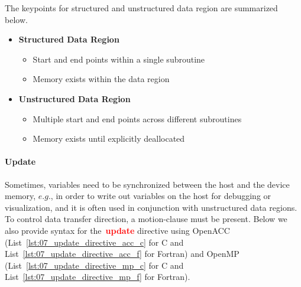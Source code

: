 











\par
The keypoints for structured and unstructured data region are summarized below.
\begin{itemize}
    \item \textbf{Structured Data Region}
    \begin{itemize}
        \item Start and end points within a single subroutine
        \item Memory exists within the data region
    \end{itemize}
    \item \textbf{Unstructured Data Region}
    \begin{itemize}
        \item Multiple start and end points across different subroutines
        \item Memory exists until explicitly deallocated
    \end{itemize}
\end{itemize}


\paragraph{Update}
Sometimes, variables need to be synchronized between the host and the device memory, $e.g.$, in order to write out variables on the host for debugging or visualization, and it is often used in conjunction with unstructured data regions.
To control data transfer direction, a motion-clause must be present.
Below we also provide syntax for the~\textbf{\textcolor{red}{update}} directive using OpenACC (List~\ref{lst:07_update_directive_acc_c} for C and List~\ref{lst:07_update_directive_acc_f} for Fortran) and OpenMP (List~\ref{lst:07_update_directive_mp_c} for C and List~\ref{lst:07_update_directive_mp_f} for Fortran).


